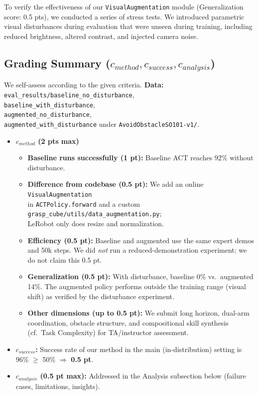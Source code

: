 \documentclass[10pt]{article} %
\begin{document}
To verify the effectiveness of our \texttt{VisualAugmentation} module (Generalization score: 0.5 pts), we conducted a series of stress tests. We introduced parametric visual disturbances during evaluation that were unseen during training, including reduced brightness, altered contrast, and injected camera noise.

\subsection{Grading Summary ($c_{method}, c_{success}, c_{analysis}$)}

We self-assess according to the given criteria. \textbf{Data:} \\
\texttt{eval\_results/baseline\_no\_disturbance}, \\
\texttt{baseline\_with\_disturbance}, \\
\texttt{augmented\_no\_disturbance}, \\
\texttt{augmented\_with\_disturbance} under \texttt{AvoidObstacleSO101-v1/}.

\begin{itemize}
    \item \textbf{$c_{method}$ (2 pts max)}
    \begin{itemize}
        \item \textbf{Baseline runs successfully (1 pt):} Baseline ACT reaches 92\% without disturbance. \checkmark
        \item \textbf{Difference from codebase (0.5 pt):} We add an online \texttt{VisualAugmentation} \\
        in \texttt{ACTPolicy.forward} and a custom \\
        \texttt{grasp\_cube/utils/data\_augmentation.py}; \\
        LeRobot only does resize and normalization. \checkmark
        \item \textbf{Efficiency (0.5 pt):} Baseline and augmented use the same expert demos and 50k steps. We did \emph{not} run a reduced-demonstration experiment; we do not claim this 0.5 pt.
        \item \textbf{Generalization (0.5 pt):} With disturbance, baseline 0\% vs.\ augmented 14\%. The augmented policy performs outside the training range (visual shift) as verified by the disturbance experiment. \checkmark
        \item \textbf{Other dimensions (up to 0.5 pt):} We submit long horizon, dual-arm coordination, obstacle structure, and compositional skill synthesis (cf.\ Task Complexity) for TA/instructor assessment.
    \end{itemize}
    \item \textbf{$c_{success}$:} Success rate of our method in the main (in-distribution) setting is 96\% $\ge$ 50\% $\Rightarrow$ \textbf{0.5 pt}.
    \item \textbf{$c_{analysis}$ (0.5 pt max):} Addressed in the Analysis subsection below (failure cases, limitations, insights).
\end{itemize}
\end{document}
